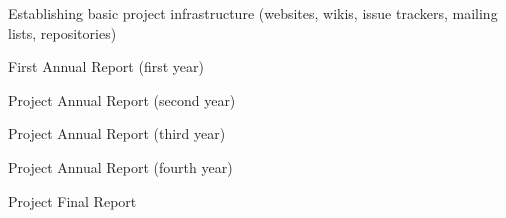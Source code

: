 \begin{workpackage}
\begin{wpdelivs}
\begin{wpdeliv}[due=1,id=tickets,dissem=PU,nature=DEC]{Establishing basic project infrastructure 
    (websites, wikis, issue trackers, mailing lists, repositories)}
\end{wpdeliv}
\begin{wpdeliv}[due=12,id=periodic-rep-1,dissem=PU,nature=OTHER]{First Annual Report (first year)}
 \end{wpdeliv}
\begin{wpdeliv}[due=24,id=periodic-rep-2,dissem=PU,nature=OTHER]{Project Annual Report (second year)}
 \end{wpdeliv}
\begin{wpdeliv}[due=36,id=periodic-rep-3,dissem=PU,nature=OTHER]{Project Annual Report (third year)}
 \end{wpdeliv}
\begin{wpdeliv}[due=48,id=periodic-rep-4,dissem=PU,nature=OTHER]{Project Annual Report (fourth year)}
 \end{wpdeliv}
\begin{wpdeliv}[due=48,id=final-mgt-rep,dissem=PU,nature=OTHER]{Project Final Report}
 \end{wpdeliv}
\end{wpdelivs}
\end{workpackage}

